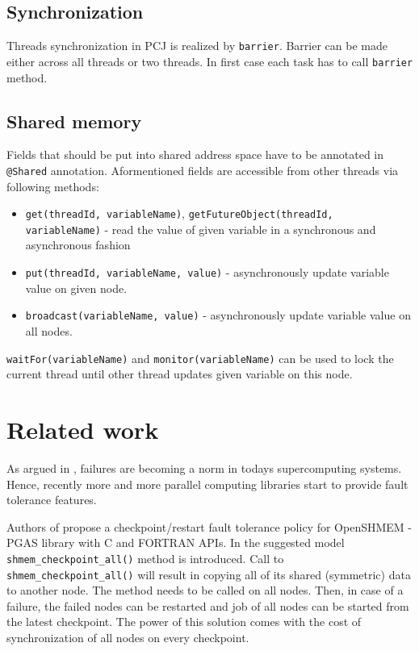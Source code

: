 \documentclass{llncs}
\newcommand{\inlinecode}{\texttt}
\begin{document}
\subsection{Synchronization}
Threads synchronization in PCJ is realized by \inlinecode{barrier}.
Barrier can be made either across all threads or two threads.
In first case each task has to call \inlinecode{barrier} method.
\subsection{Shared memory}
Fields that should be put into shared address space have to be annotated in \inlinecode{@Shared} annotation.
Aformentioned fields are accessible from other threads via following methods:
\begin{itemize}
\item\inlinecode{get(threadId, variableName)}, \inlinecode{getFutureObject(threadId, variableName)} - read the value of given variable
in a synchronous and asynchronous fashion
\item\inlinecode{put(threadId, variableName, value)} - asynchronously update variable value on given node.
\item\inlinecode{broadcast(variableName, value)} - asynchronously update variable value on all nodes.
\end{itemize}
\inlinecode{waitFor(variableName)} and \inlinecode{monitor(variableName)} can be used to lock the current thread until other thread updates given variable on this node.

\section{Related work}
As argued in \cite{shmem}, failures are becoming a norm in todays supercomputing systems.
Hence, recently more and more parallel computing libraries start to provide fault tolerance features.

Authors of \cite{shmem} propose a checkpoint/restart fault tolerance policy for OpenSHMEM - PGAS library with C and FORTRAN APIs.
In the suggested model \inlinecode{shmem\_checkpoint\_all()} method is introduced.
Call to \inlinecode{shmem\_checkpoint\_all()} will result in copying all of its shared (symmetric) data to another node.
The method needs to be called on all nodes.
Then, in case of a failure, the failed nodes can be restarted and job of all nodes can be started from the latest checkpoint.
The power of this solution comes with the cost of synchronization of all nodes on every checkpoint.
\end{document}
